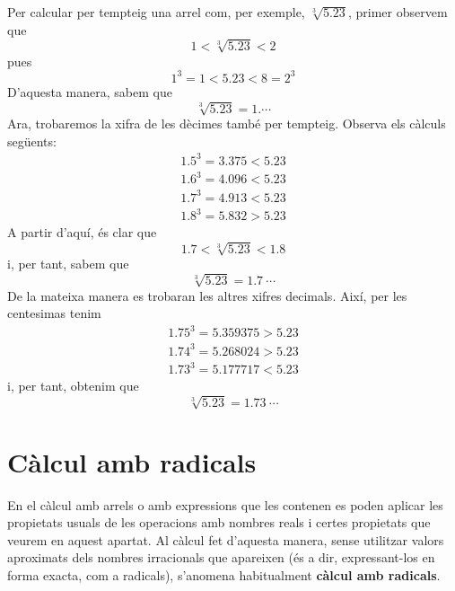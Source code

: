 Per calcular per tempteig una arrel com, per exemple, $\sqrt[3]{5.23}$,
primer observem que%
\begin{equation*}
1<\sqrt[3]{5.23}<2
\end{equation*}%
pues%
\begin{equation*}
1^{3}=1<5.23<8=2^{3}
\end{equation*}%
D’aquesta manera, sabem que 
\begin{equation*}
\sqrt[3]{5.23}=1.\cdots
\end{equation*}%
Ara, trobaremos la xifra de les dècimes també per tempteig.
Observa els càlculs següents:%
\begin{equation*}
\begin{array}{c}
1.5^{3}=3.375<5.23 \\ 
1.6^{3}=4.096<5.23 \\ 
1.7^{3}=4.913<5.23 \\ 
1.8^{3}=5.832>5.23%
\end{array}%
\end{equation*}%
A partir d’aquí, és clar que%
\begin{equation*}
1.7<\sqrt[3]{5.23}<1.8
\end{equation*}%
i, per tant, sabem que 
\begin{equation*}
\sqrt[3]{5.23}=1.7~\cdots
\end{equation*}%
De la mateixa manera es trobaran les altres xifres decimals. Així,
per les centesimas tenim%
\begin{equation*}
\begin{array}{c}
1.75^{3}=5.359375>5.23 \\ 
1.74^{3}=5.268024>5.23 \\ 
1.73^{3}=5.177717<5.23%
\end{array}%
\end{equation*}%
i, per tant, obtenim que 
\begin{equation*}
\sqrt[3]{5.23}=1.73~\cdots
\end{equation*}

\section{Càlcul amb radicals}

En el càlcul amb arrels o amb expressions que les contenen es
poden aplicar les propietats usuals de les operacions amb nombres
reals i certes propietats que veurem en aquest apartat. Al càlcul
fet d’aquesta manera, sense utilitzar valors aproximats dels nombres
irracionals que apareixen (és a dir, expressant-los en forma exacta, com a
radicals), s’anomena habitualment \textbf{càlcul amb radicals}.

